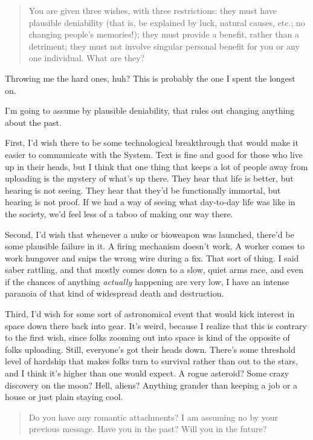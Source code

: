 \begin{quote}
You are given three wishes, with three restrictions: they must have plausible deniability (that is, be explained by luck, natural causes, etc.; no changing people's memories!); they must provide a benefit, rather than a detriment; they must not involve singular personal benefit for you or any one individual. What are they?
\end{quote}

\noindent Throwing me the hard ones, huh? This is probably the one I spent the longest on.

I'm going to assume by plausible deniability, that rules out changing anything about the past.

First, I'd wish there to be some technological breakthrough that would make it easier to communicate with the System. Text is fine and good for those who live up in their heads, but I think that one thing that keeps a lot of people away from uploading is the mystery of what's up there. They hear that life is better, but hearing is not seeing. They hear that they'd be functionally immortal, but hearing is not proof. If we had a way of seeing what day-to-day life was like in the society, we'd feel less of a taboo of making our way there.

Second, I'd wish that whenever a nuke or bioweapon was launched, there'd be some plausible failure in it. A firing mechanism doesn't work. A worker comes to work hungover and snips the wrong wire during a fix. That sort of thing. I said saber rattling, and that mostly comes down to a slow, quiet arms race, and even if the chances of anything \emph{actually} happening are very low, I have an intense paranoia of that kind of widespread death and destruction.

Third, I'd wish for some sort of astronomical event that would kick interest in space down there back into gear. It's weird, because I realize that this is contrary to the first wish, since folks zooming out into space is kind of the opposite of folks uploading. Still, everyone's got their heads down. There's some threshold level of hardship that makes folks turn to survival rather than out to the stars, and I think it's higher than one would expect. A rogue asteroid? Some crazy discovery on the moon? Hell, aliens? Anything grander than keeping a job or a house or just plain staying cool.

\begin{quote}
Do you have any romantic attachments? I am assuming no by your previous message. Have you in the past? Will you in the future?
\end{quote}

